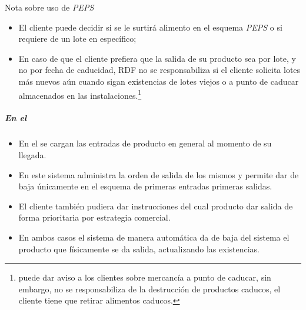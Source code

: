 \begin{nota}{Nota sobre uso de \emph{PEPS}}
	\label{nota:PEPS}
\begin{itemize}
		\item El cliente puede decidir si se le surtirá \gls{alimento} en el esquema \emph{PEPS} o si requiere de un lote en específico;
		\item En caso de que el cliente prefiera que la salida de su producto sea por lote, y no por fecha de caducidad, \gls{RDF} no se responsabiliza si el cliente solicita lotes más nuevos aún cuando sigan existencias de lotes viejos o a punto de caducar almacenados en las instalaciones.\footnote{ puede dar aviso a los clientes sobre mercancía a punto de caducar, sin embargo,  no se responsabiliza de la destrucción de productos caducos, el cliente tiene que retirar \glspl{alimento} caducos.}
\end{itemize}
\end{nota}


\subparagraph{En el }

\begin{itemize}
	\item En el  se cargan las entradas de producto en general al momento de su llegada.
	\item En este sistema administra la orden de salida de los mismos y permite dar de baja únicamente en el esquema de primeras entradas primeras salidas.
	\item El cliente también pudiera dar instrucciones del cual producto dar salida de forma prioritaria por estrategia comercial.
	\item En ambos casos el sistema de manera automática da de baja del sistema el producto que físicamente se da salida, actualizando las existencias.
\end{itemize}

